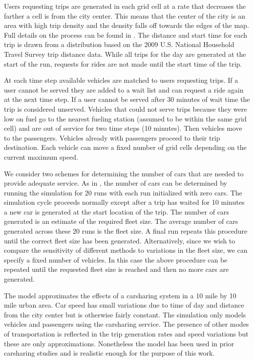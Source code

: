 \documentclass[letterpaper]{article}
\begin{document}
Users requesting trips are generated in each grid cell at a rate that decreases the farther a cell is from the city center. This means that the center of the city is an area with high trip density and the density falls off towards the edges of the map. Full details on the process can be found in \cite{fagnant2014travel}. The distance and start time for each trip is drawn from a distribution based on the 2009 U.S. National Household Travel Survey trip distance data. While all trips for the day are generated at the start of the run, requests for rides are not made until the start time of the trip. 

At each time step available vehicles are matched to users requesting trips. If a user cannot be served they are added to a wait list and can request a ride again at the next time step. If a user cannot be served after 30 minutes of wait time the trip is considered unserved. Vehicles that could not serve trips because they were low on fuel go to the nearest fueling station (assumed to be within the same grid cell) and are out of service for two time steps (10 minutes). Then vehicles move to the passengers. Vehicles already with passengers proceed to their trip destination. Each vehicle can move a fixed number of grid cells depending on the current maximum speed.

We consider two schemes for determining the number of cars that are needed to provide adequate service. As in \cite{fagnant2014travel}, the number of cars can be determined by running the simulation for 20 runs with each run initialized with zero cars. The simulation cycle proceeds normally except after a trip has waited for 10 minutes a new car is generated at the start location of the trip. The number of cars generated is an estimate of the required fleet size. The average number of cars generated across these 20 runs is the fleet size. A final run repeats this procedure until the correct fleet size has been generated. Alternatively, since we wish to compare the sensitivity of different methods to variations in the fleet size, we can specify a fixed number of vehicles. In this case the above procedure can be repeated until the requested fleet size is reached and then no more cars are generated.

The model approximates the effects of a carsharing system in a 10 mile by 10 mile urban area. Car speed has small variations due to time of day and distance from the city center but is otherwise fairly constant. The simulation only models vehicles and passengers using the carsharing service. The presence of other modes of transportation is reflected in the trip generation rates and speed variations but these are only approximations. Nonetheless the model has been used in prior carsharing studies \cite{fagnant2015operations} and is realistic enough for the purpose of this work. 
\end{document}
